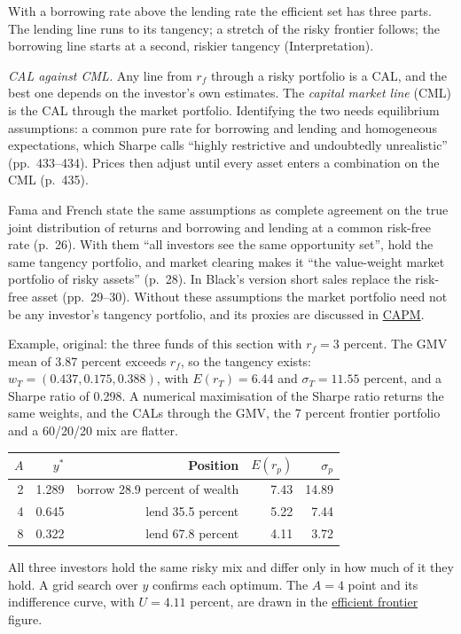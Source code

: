 \begin{qfmethod}
With a borrowing rate above the lending rate the efficient set has three parts. The lending line runs to its tangency; a stretch of the risky frontier follows; the borrowing line starts at a second, riskier tangency (Interpretation).

\emph{CAL against CML.} Any line from $r_f$ through a risky portfolio is a CAL, and the best one depends on the investor's own estimates. The \emph{capital market line} (CML) is the CAL through the market portfolio. Identifying the two needs equilibrium assumptions: a common pure rate for borrowing and lending and homogeneous expectations, which Sharpe calls ``highly restrictive and undoubtedly unrealistic'' (pp.~433--434). Prices then adjust until every asset enters a combination on the CML (p.~435).

Fama and French state the same assumptions as complete agreement on the true joint distribution of returns and borrowing and lending at a common risk-free rate (p.~26). With them ``all investors see the same opportunity set'', hold the same tangency portfolio, and market clearing makes it ``the value-weight market portfolio of risky assets'' (p.~28). In Black's version short sales replace the risk-free asset (pp.~29--30). Without these assumptions the market portfolio need not be any investor's tangency portfolio, and its proxies are discussed in \hyperref[mod:capm-sml]{CAPM}.

 Example, original: the three funds of this section with $r_f=3$ percent. The GMV mean of 3.87 percent exceeds $r_f$, so the tangency exists: $w_T=(0.437,0.175,0.388)$, with $E(r_T)=6.44$ and $\sigma_T=11.55$ percent, and a Sharpe ratio of 0.298. A numerical maximisation of the Sharpe ratio returns the same weights, and the CALs through the GMV, the 7 percent frontier portfolio and a 60/20/20 mix are flatter.

\begin{center}\small
\begin{tabular}{@{}rrrrr@{}}
\toprule
$A$ & $y^\ast$ & Position & $E(r_p)$ & $\sigma_p$ \\
\midrule
2 & 1.289 & borrow 28.9 percent of wealth & 7.43 & 14.89 \\
4 & 0.645 & lend 35.5 percent & 5.22 & 7.44 \\
8 & 0.322 & lend 67.8 percent & 4.11 & 3.72 \\
\bottomrule
\end{tabular}
\end{center}

All three investors hold the same risky mix and differ only in how much of it they hold. A grid search over $y$ confirms each optimum. The $A=4$ point and its indifference curve, with $U=4.11$ percent, are drawn in the \hyperref[meth:efficient-frontier]{efficient frontier} figure.


\end{qfmethod}
